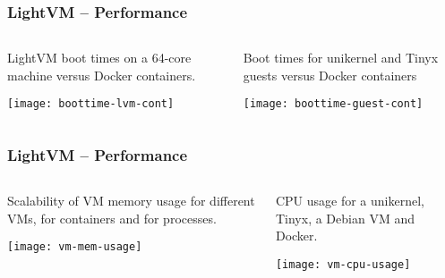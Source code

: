 \begin{frame}[plain]
	\frametitle{LightVM -- Performance}
	
	
	
	\begin{columns}
		
		\begin{column}{.5\textwidth}
			LightVM boot times on a 64-core machine
			versus Docker containers.
			
			\texttt{[image: boottime-lvm-cont]}
			
		\end{column}			
		
		\begin{column}{.5\textwidth}
			Boot times for unikernel and Tinyx guests
			versus Docker containers
			
			\centering
			\texttt{[image: boottime-guest-cont]}
			
			
		\end{column}
		
		
	\end{columns}
	
	
\end{frame}


\begin{frame}[plain]
	\frametitle{LightVM -- Performance}
	
	
	
	\begin{columns}
		
		\begin{column}{.5\textwidth}
			Scalability of VM memory usage for different VMs, for containers and for processes.
			
			
			\texttt{[image: vm-mem-usage]}
			
		\end{column}
		
		\begin{column}{.5\textwidth}			

			CPU usage for a unikernel, Tinyx, a Debian
			VM and Docker.
			
			
			\centering
			\texttt{[image: vm-cpu-usage]}
			
			
		\end{column}
		
		
	\end{columns}
	
	
\end{frame}

